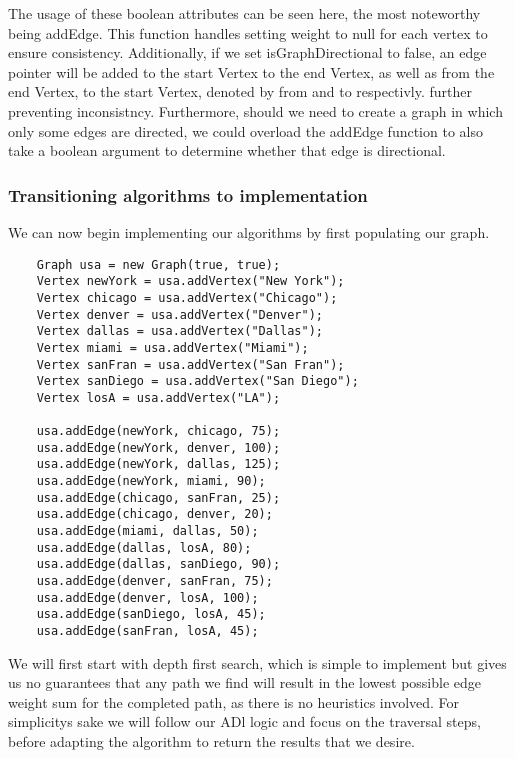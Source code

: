 \documentclass[a4paper]{article}
\begin{document}
The usage of these boolean attributes can be seen here, the most noteworthy being addEdge.
This function handles setting weight to null for each vertex to ensure consistency.
Additionally, if we set isGraphDirectional to false, an edge pointer will be added to the
start Vertex to the end Vertex, as well as from the end Vertex, to the start Vertex, denoted by from and to respectivly.
further preventing inconsistncy. Furthermore, should we need to create a graph in which only some edges are directed, 
we could overload the addEdge function to also take a boolean argument to determine whether that edge is directional.

\newpage



  

\subsubsection{Transitioning algorithms to implementation}

We can now begin implementing our algorithms by first populating our graph. \\


\begin{verbatim}
    Graph usa = new Graph(true, true);
    Vertex newYork = usa.addVertex("New York");
    Vertex chicago = usa.addVertex("Chicago");
    Vertex denver = usa.addVertex("Denver");
    Vertex dallas = usa.addVertex("Dallas");
    Vertex miami = usa.addVertex("Miami");
    Vertex sanFran = usa.addVertex("San Fran");
    Vertex sanDiego = usa.addVertex("San Diego");
    Vertex losA = usa.addVertex("LA");

    usa.addEdge(newYork, chicago, 75);
    usa.addEdge(newYork, denver, 100);
    usa.addEdge(newYork, dallas, 125);
    usa.addEdge(newYork, miami, 90);
    usa.addEdge(chicago, sanFran, 25);
    usa.addEdge(chicago, denver, 20);
    usa.addEdge(miami, dallas, 50);
    usa.addEdge(dallas, losA, 80);
    usa.addEdge(dallas, sanDiego, 90);
    usa.addEdge(denver, sanFran, 75);
    usa.addEdge(denver, losA, 100);
    usa.addEdge(sanDiego, losA, 45);
    usa.addEdge(sanFran, losA, 45);
\end{verbatim}




\vspace{12mm}

We will first start with depth first search, which is simple to implement but gives
us no guarantees that any path we find will result in the lowest possible edge weight sum 
for the completed path, as there is no heuristics involved. For simplicitys sake we will follow our ADl logic and focus on the traversal 
steps, before adapting the algorithm to return the results that we desire.
\end{document}
